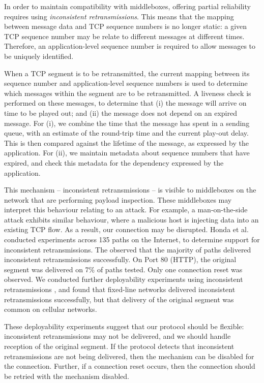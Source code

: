 \documentclass{sig-alternate-05-2015}
\begin{document}
In order to maintain compatibility with middleboxes, offering partial
reliability requires using \emph{inconsistent retransmissions}. This means
that the mapping between message data and TCP sequence numbers is no longer
static: a given TCP sequence number may be relate to different messages at
different times. Therefore, an application-level sequence number is
required to allow messages to be uniquely identified.

When a TCP segment is to be retransmitted, the current mapping between its
sequence number and application-level sequence numbers is used to determine
which messages within the segment are to be retransmitted. A liveness check
is performed on these messages, to determine that (i) the message will
arrive on time to be played out; and (ii) the message does not depend on an
expired message. For (i), we combine the time that the message has spent in
a sending queue, with an estimate of the round-trip time and the current
play-out delay. This is then compared against the lifetime of the message,
as expressed by the application. For (ii), we maintain metadata about
sequence numbers that have expired, and check this metadata for the
dependency expressed by the application.

This mechanism -- inconsistent retransmissions -- is visible to middleboxes
on the network that are performing payload inspection. These middleboxes
may interpret this behaviour relating to an attack. For example, a
man-on-the-side attack exhibits similar behaviour, where a malicious host
is injecting data into an existing TCP flow. As a result, our connection
may be disrupted. Honda et al. \cite{honda:2011:extend-tcp} conducted
experiments across 135 paths on the Internet, to determine support for
inconsistent retransmissions. The observed that the majority of paths
delivered inconsistent retransmissions successfully. On Port 80 (HTTP), the
original segment was delivered on 7\% of paths tested. Only one connection
reset was observed. We conducted further deployability experiments using
inconsistent retransmissions \cite{mcquistin2016hollywood}, and found that
fixed-line networks delivered inconsistent retransmissions successfully,
but that delivery of the original segment was common on cellular networks.

These deployability experiments suggest that our protocol should be
flexible: inconsistent retransmissions may not be delivered, and we should
handle reception of the original segment. If the protocol detects that
inconsistent retransmissions are not being delivered, then the mechanism
can be disabled for the connection. Further, if a connection reset occurs,
then the connection should be retried with the mechanism disabled.
\end{document}
